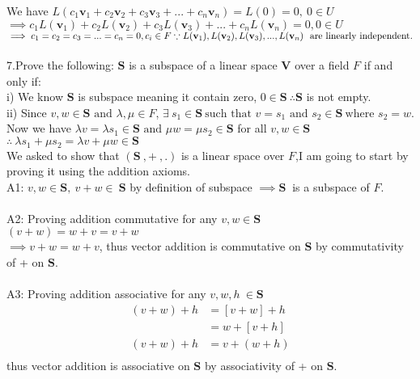 \documentclass[10pt,a4paper]{article}
\numberwithin{equation}{section}
\begin{document}
We have $L(c_{1}\mathbf{v}_{1}+c_{2}\mathbf{v}_{2}+c_{3}\mathbf{v}_{3}+...+c_{n}\mathbf{v}_{n})=L(0)=0,~0 \in U$ \\
$\implies c_{1}L(\mathbf{v}_{1})+c_{2}L(\mathbf{v}_{2})+c_{3}L(\mathbf{v}_{3})+...+c_{n}L(\mathbf{v}_{n})=0, 0 \in U$ \\
$\implies c_{1}=c_{2}=c_{3}=...=c_{n}=0, c_{i} \in F \\ \because L(\mathbf{v}_{1}),L(\mathbf{v}_{2}),L(\mathbf{v}_{3}),...,L(\mathbf{v}_{n})~ \text{ are linearly independent.}$\\
~\\
7.Prove the following: $\mathbf{S}$ is a subspace of a linear space $\mathbf{V}$ over a field $F$ if and only if: \\
i) We know $\mathbf{S}$ is subspace meaning it contain zero, $0 \in \mathbf{S}~\therefore \mathbf{S} $ is not empty. \\
ii) Since $v,w \in \mathbf{S} \text{ and } \lambda, \mu \in F$, $\exists~ s_{1} \in \mathbf{S}~ \text{such that } v=s_{1} \text{ and } s_{2} \in \mathbf{S}~ \text{where } s_{2}=w$. Now we have $\lambda v=\lambda s_{1} \in \mathbf{S} \text{ and } \mu w = \mu s_{2} \in \mathbf{S} $ for all $ v,w \in \mathbf{S}$ \\
$\therefore ~ \lambda s_{1}+\mu s_{2}= \lambda v + \mu w \in \mathbf{S}$ \\
 We asked to show that $(\textbf{S}~,+~,.)$ is a linear space over $F$,I am going to start by proving it using the addition axioms. \\
A1: $v,w \in \mathbf{S},~v+w \in~\mathbf{S}$ by definition of subspace $\implies \mathbf{S}~$ is a subspace of $F$. \\
~\\
A2: Proving addition commutative for any $v,w \in \mathbf{S}$ \\
$(v+w) = w+v=v+w$ \\
$\implies v+w=w+v$, thus vector addition is commutative on $\mathbf{S}$ by commutativity of + on $\mathbf{S}$. \\
~\\
A3: Proving addition associative for any $v,w,h \ \in \mathbf{S}$
\begin{align*}
	(v+w)+h&=[v+w]+h \\
	&=w+[v+h]\\
	(v+w)+h&=v+(w+h) \\
\end{align*}
thus vector addition is associative on $\mathbf{S}$ by associativity of + on $\mathbf{S}$. \\
\end{document}
